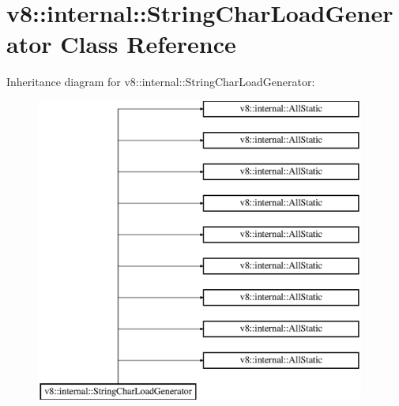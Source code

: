 \hypertarget{classv8_1_1internal_1_1_string_char_load_generator}{}\section{v8\+:\+:internal\+:\+:String\+Char\+Load\+Generator Class Reference}
\label{classv8_1_1internal_1_1_string_char_load_generator}
Inheritance diagram for v8\+:\+:internal\+:\+:String\+Char\+Load\+Generator\+:\begin{figure}[H]
\begin{center}
\leavevmode
\includegraphics[height=10.000000cm]{classv8_1_1internal_1_1_string_char_load_generator}
\end{center}
\end{figure}
